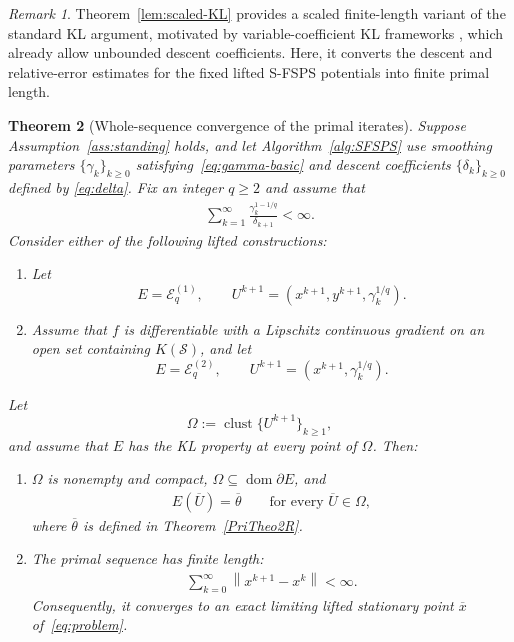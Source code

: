 \documentclass[9pt]{article}
\numberwithin{equation}{section}
\newtheorem{theorem}{Theorem}[section]
\theoremstyle{definition}
\theoremstyle{remark}
\newtheorem{remark}[theorem]{Remark}
\newcommand{\Sset}{\mathcal S}
\newcommand{\norm}[1]{\left\lVert #1\right\rVert}
\newcommand{\Ecal}{\mathcal E}
\DeclareMathOperator{\dom}{dom}
\DeclareMathOperator{\clust}{clust}
\begin{document}
\begin{remark}
Theorem~\ref{lem:scaled-KL} provides a scaled finite-length variant
of the standard KL argument, motivated by variable-coefficient
KL frameworks \cite{FrankelGarrigosPeypouquet2015}, which already
allow unbounded descent coefficients. Here, it converts the
descent and relative-error estimates for the fixed lifted
S-FSPS potentials into finite primal length.
\end{remark}


\begin{theorem}[Whole-sequence convergence of the primal iterates]
\label{thm:main}
Suppose Assumption~\ref{ass:standing} holds, and let
Algorithm~\ref{alg:SFSPS} use smoothing parameters
$\{\gamma_k\}_{k\geq0}$ satisfying~\eqref{eq:gamma-basic} and
descent coefficients $\{\delta_k\}_{k\geq0}$ defined by
\eqref{eq:delta}.
Fix an integer $q\geq2$ and assume that
\begin{eqnarray}\label{eq:schedule-condition}
\sum_{k=1}^{\infty}
 \frac{\gamma_k^{1-1/q}}{\delta_{k+1}}<\infty.
\end{eqnarray}
Consider either of the following lifted constructions:
\begin{enumerate}[label=(\alph*),leftmargin=2.2em]
\item Let
\[
 E=\Ecal_q^{(1)},\qquad
 U^{k+1}=(x^{k+1},y^{k+1},\gamma_k^{1/q}).
\]

\item Assume that $f$ is differentiable with a Lipschitz continuous
gradient on an open set containing $K(\Sset)$, and let
\[
 E=\Ecal_q^{(2)},\qquad
 U^{k+1}=(x^{k+1},\gamma_k^{1/q}).
\]
\end{enumerate}
Let
\[
 \Omega:=\clust\{U^{k+1}\}_{k\geq1},
\]
and assume that $E$ has the KL property at every point of $\Omega$.
Then:
\begin{enumerate}
\item[(i)] $\Omega$ is nonempty and compact,
$\Omega\subseteq\dom\partial E$, and
\begin{eqnarray}\label{eq:cluster-value}
 E(\overline U)=\overline\theta
 \qquad\text{for every }\overline U\in\Omega,
\end{eqnarray}
where $\overline\theta$ is defined in Theorem~\ref{PriTheo2R}.
\item[(ii)] The primal sequence has finite length:
\begin{eqnarray}\label{eq:finite-length}
\sum_{k=0}^{\infty}\norm{x^{k+1}-x^k}<\infty.
\end{eqnarray}
Consequently, it converges to an exact limiting lifted stationary point
$\overline x$ of~\eqref{eq:problem}.
\end{enumerate}
\end{theorem}
\end{document}
